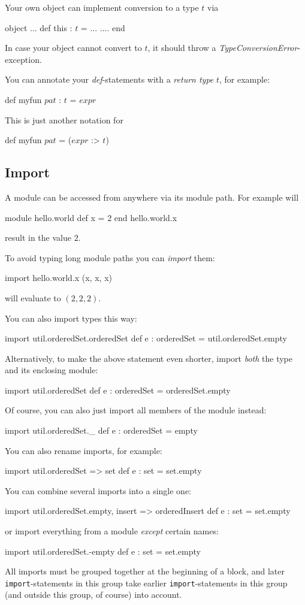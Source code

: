 \documentclass[11pt]{amsart}
\newcommand{\babelsrc}[1] {\lstinline!#1!}
\begin{document}
Your own object can implement conversion to a type $t$ via 
\begin{babellisting}
object 
  ...
  def this : $t$ = ...
  ....
end
\end{babellisting}
In case your object cannot convert to $t$, it should throw a \emph{TypeConversionError}-exception.

You can annotate your \emph{def}-statements with a \emph{return type} $t$, for example:
\begin{babellisting}
def myfun $pat$ : $t$ = $expr$
\end{babellisting}
This is just another notation for
\begin{babellisting}
def myfun $pat$ = ($expr$ :> $t$)
\end{babellisting}

\subsection{Import}
A module can be accessed from anywhere via its module path. For example will 
\begin{babellisting}
module hello.world
  def x = 2
end
hello.world.x
\end{babellisting}
result in the value $2$.

To avoid typing long module paths you can \emph{import} them:
\begin{babellisting}
import hello.world.x
(x, x, x)
\end{babellisting}
will evaluate to $(2, 2, 2)$. 

You can also import types this way:
\begin{babellisting}
import util.orderedSet.orderedSet
def e : orderedSet = util.orderedSet.empty
\end{babellisting}
Alternatively, to make the above statement even shorter, import \emph{both} the type and its enclosing module:
\begin{babellisting}
import util.orderedSet
def e : orderedSet = orderedSet.empty
\end{babellisting}
Of course, you can also just import all members of the module instead:
\begin{babellisting}
import util.orderedSet._
def e : orderedSet = empty
\end{babellisting}
You can also rename imports, for example:
\begin{babellisting}
import util.orderedSet => set
def e : set = set.empty
\end{babellisting}
You can combine several imports into a single one:
\begin{babellisting}
import util.orderedSet.{empty, insert => orderedInsert} 
def e : set = set.empty
\end{babellisting}
or import everything from a module \emph{except} certain names:
\begin{babellisting}
import util.orderedSet.{-empty}
def e : set = set.empty
\end{babellisting}
All imports must be grouped together at the beginning of a block, and later \babelsrc{import}-statements in this group take earlier \babelsrc{import}-statements in this group (and outside this group, of course) into account.
\end{document}
